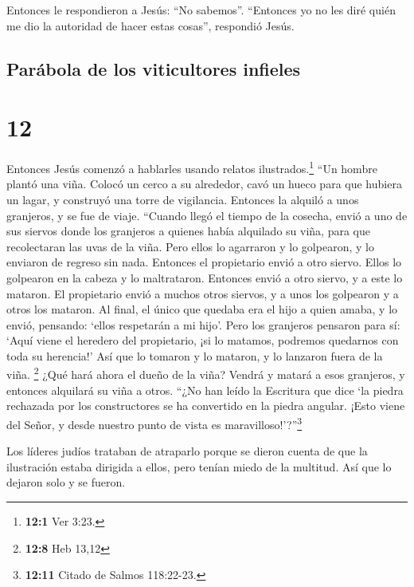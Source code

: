  Entonces le respondieron a Jesús: ``No sabemos''.
``Entonces yo no les diré quién me dio la autoridad de hacer estas
cosas'', respondió Jesús.

\hypertarget{paruxe1bola-de-los-viticultores-infieles}{%
\subsection{Parábola de los viticultores
infieles}\label{paruxe1bola-de-los-viticultores-infieles}}

\hypertarget{section-11}{%
\section{12}\label{section-11}}

 Entonces Jesús comenzó a hablarles usando relatos
ilustrados.\footnote{\textbf{12:1} Ver 3:23.} ``Un hombre plantó una
viña. Colocó un cerco a su alrededor, cavó un hueco para que hubiera un
lagar, y construyó una torre de vigilancia. Entonces la alquiló a unos
granjeros, y se fue de viaje.  ``Cuando llegó el tiempo de
la cosecha, envió a uno de sus siervos donde los granjeros a quienes
había alquilado su viña, para que recolectaran las uvas de la viña.
 Pero ellos lo agarraron y lo golpearon, y lo enviaron de
regreso sin nada.  Entonces el propietario envió a otro
siervo. Ellos lo golpearon en la cabeza y lo maltrataron. 
Entonces envió a otro siervo, y a este lo mataron. El propietario envió
a muchos otros siervos, y a unos los golpearon y a otros los mataron.
 Al final, el único que quedaba era el hijo a quien amaba,
y lo envió, pensando: `ellos respetarán a mi hijo'.  Pero
los granjeros pensaron para sí: `Aquí viene el heredero del propietario,
¡si lo matamos, podremos quedarnos con toda su herencia!' 
Así que lo tomaron y lo mataron, y lo lanzaron fuera de la viña.
\footnote{\textbf{12:8} Heb 13,12}  ¿Qué hará ahora el
dueño de la viña? Vendrá y matará a esos granjeros, y entonces alquilará
su viña a otros.  ``¿No han leído la Escritura que dice
`la piedra rechazada por los constructores se ha convertido en la piedra
angular.  ¡Esto viene del Señor, y desde nuestro punto de
vista es maravilloso!'?''\footnote{\textbf{12:11} Citado de Salmos
  118:22-23.}

 Los líderes judíos trataban de atraparlo porque se
dieron cuenta de que la ilustración estaba dirigida a ellos, pero tenían
miedo de la multitud. Así que lo dejaron solo y se fueron.

